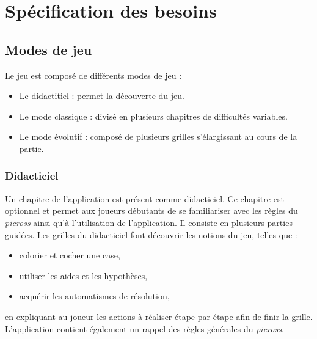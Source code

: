 \documentclass{report}
\begin{document}
		
\chapter{Spécification des besoins}
		\section{Modes de jeu}
			
			Le jeu est composé de différents modes de jeu :
			\begin{itemize}
            	\item Le didactitiel : permet la découverte du jeu.
            	\item Le mode classique : divisé en plusieurs chapitres de difficultés variables.
            	\item Le mode évolutif : composé de plusieurs grilles s'élargissant au cours de la partie.
        	\end{itemize}

	    \subsection{Didacticiel}
		    Un chapitre de l'application est présent comme didacticiel. Ce chapitre est optionnel et permet aux joueurs   débutants de se familiariser avec les règles du \textit{picross} ainsi qu'à l'utilisation de l'application. Il consiste en plusieurs parties guidées. Les grilles du didacticiel font découvrir les notions du jeu, telles que :
		    \begin{itemize}
            	\item colorier et cocher une case,
            	\item utiliser les aides et les hypothèses,
            	\item acquérir les automatismes de résolution,
        	\end{itemize}
		    en expliquant au joueur les actions à réaliser étape par étape afin de finir la grille. L'application contient également un rappel des règles générales du \textit{picross}.
		    
\end{document}
